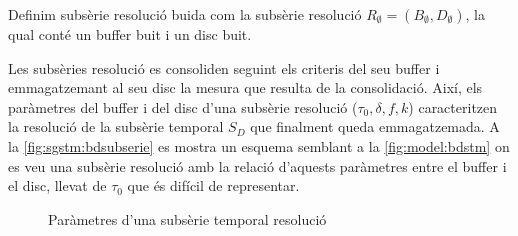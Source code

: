 \begin{definition}\label{def:model:subserie_resolucio_buida}
  Definim subsèrie resolució buida com la subsèrie resolució $R_{\emptyset}
  = (B_{\emptyset},D_{\emptyset})$, la qual conté un buffer buit i un
  disc buit.
\end{definition}


Les subsèries resolució es consoliden seguint els criteris del seu
buffer i emmagatzemant al seu disc la mesura que resulta de la
consolidació. Així, els paràmetres del buffer i del disc d'una
subsèrie resolució ($\tau_0, \delta, f, k$) caracteritzen la resolució
de la subsèrie temporal $S_D$ que finalment queda emmagatzemada.  A la
\autoref{fig:sgstm:bdsubserie} es mostra un esquema semblant a la
\autoref{fig:model:bdstm} on es veu una subsèrie resolució amb la
relació d'aquests paràmetres entre el buffer i el disc, llevat de
$\tau_0$ que és difícil de representar.


\begin{figure}[tp]
  \centering
  
  \caption{Paràmetres d'una subsèrie temporal resolució}
  \label{fig:sgstm:bdsubserie}
\end{figure}



